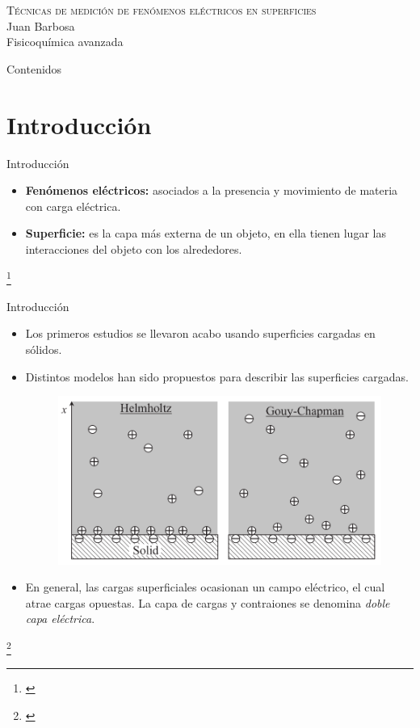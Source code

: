 \documentclass[handout]{beamer}
\newcommand\blfootnote[1]
{%
	\begingroup
	\renewcommand\thefootnote{}\footnote{#1}%
	\addtocounter{footnote}{-1}%
	\endgroup
}
\newcommand{\fcite}[1]{\blfootnote{\cite{#1}}}
\begin{document}
	\begin{frame}
		\centering
		\textsc{\Large Técnicas de medición de fenómenos eléctricos en superficies}
		\\
		\vspace{3cm}
		\raggedleft Juan Barbosa \\
		\raggedleft \small Fisicoqu\'imica avanzada
	\end{frame}

\begin{frame}{Contenidos}
	\tableofcontents
\end{frame}

\section{Introducci\'on}
\begin{frame}{Introducci\'on}
	\begin{itemize}
		\item \textbf{Fen\'omenos el\'ectricos:} asociados a la presencia y movimiento de materia con carga el\'ectrica.
		
		\item \textbf{Superficie:} es la capa m\'as externa de un objeto, en ella tienen lugar las interacciones del objeto con los alrededores.
	\end{itemize}

	\fcite{butt2006physics}
\end{frame}

\begin{frame}{Introducci\'on}
	\begin{itemize}
		\item Los primeros estudios se llevaron acabo usando superficies cargadas en s\'olidos.
		
		\item Distintos modelos han sido propuestos para describir las superficies cargadas.
		\begin{figure}[h]
			\centering
			\includegraphics[width=0.5\linewidth]{sources/surfaceLiquid}
		\end{figure}
	
		\item En general, las cargas superficiales ocasionan un campo el\'ectrico, el cual atrae cargas opuestas. La capa de cargas y contraiones se denomina \textit{doble capa el\'ectrica}.
	\end{itemize}
	\fcite{butt2006physics}
\end{frame}
\end{document}
